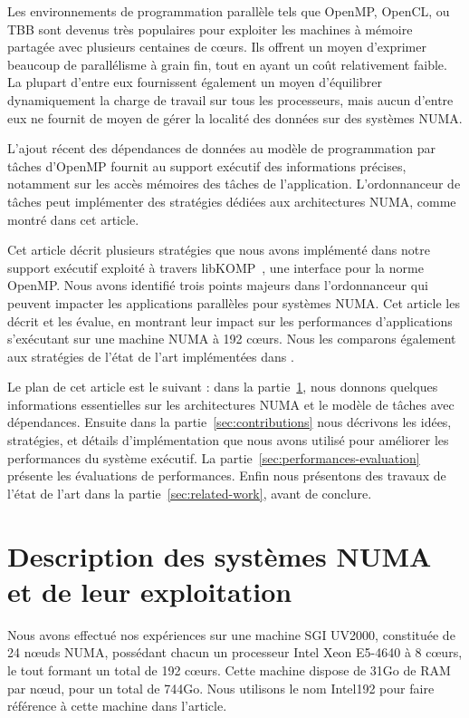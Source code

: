 \documentclass[parallelisme]{compas2016}
\begin{document}
Les environnements de programmation parallèle tels que OpenMP, OpenCL, ou TBB sont devenus très
populaires pour exploiter les machines à mémoire partagée avec plusieurs centaines de cœurs.
Ils offrent un moyen d'exprimer beaucoup de parallélisme à grain fin, tout en
ayant un coût relativement faible. La plupart d'entre eux fournissent également
un moyen d'équilibrer dynamiquement la charge de travail sur tous les processeurs,
mais aucun d'entre eux ne fournit de moyen de gérer la localité
des données sur des systèmes NUMA.

L'ajout récent des dépendances de données au modèle de programmation par tâches
d'OpenMP fournit au support exécutif des informations précises, notamment sur les
accès mémoires des tâches de l'application.
L'ordonnanceur de tâches peut implémenter des stratégies dédiées aux architectures
NUMA, comme montré dans cet article.

Cet article décrit plusieurs stratégies que nous avons implémenté dans notre support
exécutif \kaapi exploité à travers libKOMP~\cite{libkomp}, une interface pour la norme OpenMP.
Nous avons identifié trois points majeurs dans l'ordonnanceur qui
peuvent impacter les applications parallèles pour systèmes NUMA. Cet article les décrit et les évalue, en montrant leur impact sur les performances
d'applications s'exécutant sur une machine NUMA à 192 cœurs.
Nous les comparons également aux stratégies de l'état de l'art implémentées dans \kaapi.

Le plan de cet article est le suivant : dans la partie~\ref{sec:background},
nous donnons quelques informations essentielles sur les architectures NUMA et
le modèle de tâches avec dépendances. Ensuite dans la partie~\ref{sec:contributions}
nous décrivons les idées, stratégies, et détails d'implémentation que nous avons
utilisé pour améliorer les performances du système exécutif. La partie~\ref{sec:performances-evaluation}
présente les évaluations de performances. Enfin nous présentons des travaux de l'état
de l'art dans la partie~\ref{sec:related-work}, avant de conclure.


\vspace*{-1ex}
\section{Description des systèmes NUMA et de leur exploitation}

\label{sec:background}

Nous avons effectué nos expériences sur une machine SGI UV2000, constituée de
24 nœuds NUMA, possédant chacun un processeur Intel Xeon E5-4640 à 8 cœurs,
le tout formant un total de 192 cœurs. Cette machine dispose de 31Go de RAM
par nœud, pour un total de 744Go. Nous utilisons le nom Intel192 pour faire
référence à cette machine dans l'article.
\end{document}
